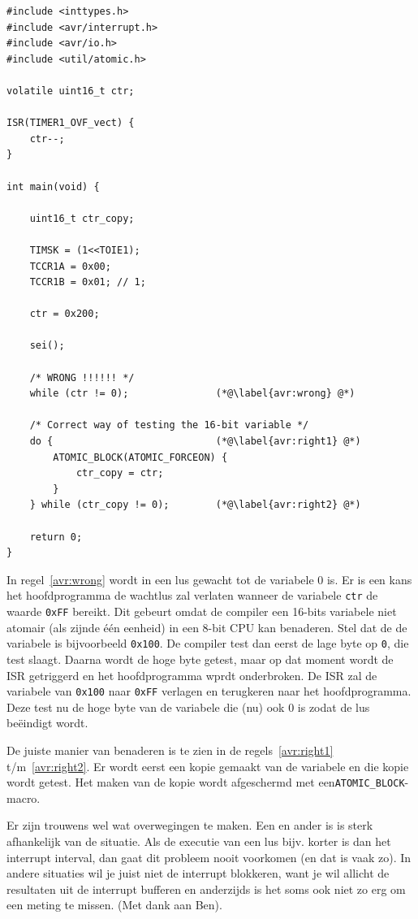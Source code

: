 \documentclass[12pt,a4paper,final,twoside,fleqn]{article}
\def\lstC{\lstinline[style=C]}
\begin{document}
\begin{lstlisting}[style=C,caption=Testen van een 16-bit variabele i.c.m.\ een ISR.]
#include <inttypes.h>
#include <avr/interrupt.h>
#include <avr/io.h>
#include <util/atomic.h>

volatile uint16_t ctr;

ISR(TIMER1_OVF_vect) {
	ctr--;
}

int main(void) {
	
	uint16_t ctr_copy;
	
	TIMSK = (1<<TOIE1);
	TCCR1A = 0x00;
	TCCR1B = 0x01; // 1;

	ctr = 0x200;

	sei();
	
	/* WRONG !!!!!! */
	while (ctr != 0);               (*@\label{avr:wrong} @*)

	/* Correct way of testing the 16-bit variable */	
	do {                            (*@\label{avr:right1} @*)
		ATOMIC_BLOCK(ATOMIC_FORCEON) {
			ctr_copy = ctr;
		}
	} while (ctr_copy != 0);        (*@\label{avr:right2} @*)
	
	return 0;
}
\end{lstlisting}

In regel~\ref{avr:wrong} wordt in een lus gewacht tot de variabele 0 is.
Er is een kans het hoofdprogramma de wachtlus zal verlaten wanneer de variabele
\lstC{ctr} de waarde \lstC{0xFF} bereikt. Dit gebeurt omdat de compiler een 16-bits
variabele niet atomair (als zijnde \'e\'en eenheid) in een 8-bit CPU kan benaderen.
Stel dat de de variabele is bijvoorbeeld \lstC{0x100}. De compiler test dan eerst
de lage byte op \lstC{0}, die test slaagt. Daarna wordt de hoge byte getest, maar op
dat moment wordt de ISR getriggerd en het hoofdprogramma wprdt onderbroken. De ISR
zal de variabele van \lstC{0x100} naar \lstC{0xFF} verlagen en terugkeren naar het
hoofdprogramma. Deze test nu de hoge byte van de variabele die (nu) ook 0 is zodat
de lus be\"eindigt wordt.

De juiste manier van benaderen is te zien in de regels~\ref{avr:right1}
t/m~\ref{avr:right2}. Er wordt eerst een kopie gemaakt van de variabele en die kopie
wordt getest. Het maken van de kopie wordt afgeschermd met een\lstC{ATOMIC_BLOCK}-macro.

Er zijn trouwens wel wat overwegingen te maken. Een en ander is is sterk afhankelijk
van de situatie. Als de executie van een lus bijv. korter is dan het interrupt interval,
dan gaat dit probleem nooit voorkomen (en dat is vaak zo). In andere situaties wil je
juist niet de interrupt blokkeren, want je wil allicht de resultaten uit de interrupt
bufferen en anderzijds is het soms ook niet zo erg om een meting te missen. (Met dank
aan Ben).
\end{document}
